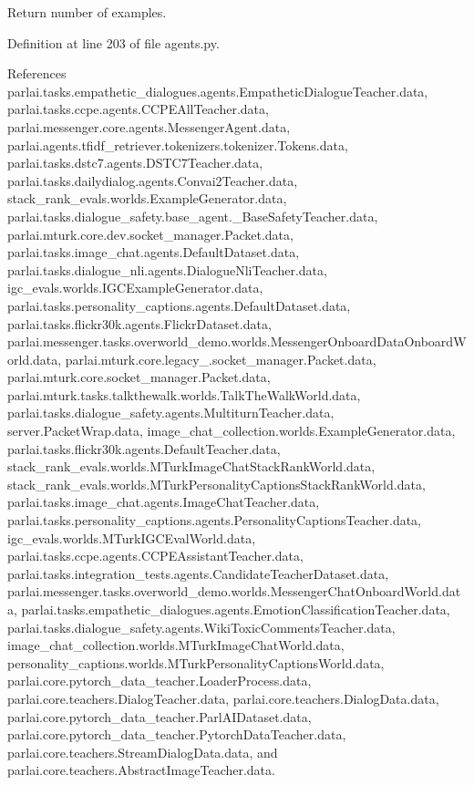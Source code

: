 \begin{DoxyVerb}Return number of examples.\end{DoxyVerb}
 

Definition at line 203 of file agents.\+py.



References parlai.\+tasks.\+empathetic\+\_\+dialogues.\+agents.\+Empathetic\+Dialogue\+Teacher.\+data, parlai.\+tasks.\+ccpe.\+agents.\+C\+C\+P\+E\+All\+Teacher.\+data, parlai.\+messenger.\+core.\+agents.\+Messenger\+Agent.\+data, parlai.\+agents.\+tfidf\+\_\+retriever.\+tokenizers.\+tokenizer.\+Tokens.\+data, parlai.\+tasks.\+dstc7.\+agents.\+D\+S\+T\+C7\+Teacher.\+data, parlai.\+tasks.\+dailydialog.\+agents.\+Convai2\+Teacher.\+data, stack\+\_\+rank\+\_\+evals.\+worlds.\+Example\+Generator.\+data, parlai.\+tasks.\+dialogue\+\_\+safety.\+base\+\_\+agent.\+\_\+\+Base\+Safety\+Teacher.\+data, parlai.\+mturk.\+core.\+dev.\+socket\+\_\+manager.\+Packet.\+data, parlai.\+tasks.\+image\+\_\+chat.\+agents.\+Default\+Dataset.\+data, parlai.\+tasks.\+dialogue\+\_\+nli.\+agents.\+Dialogue\+Nli\+Teacher.\+data, igc\+\_\+evals.\+worlds.\+I\+G\+C\+Example\+Generator.\+data, parlai.\+tasks.\+personality\+\_\+captions.\+agents.\+Default\+Dataset.\+data, parlai.\+tasks.\+flickr30k.\+agents.\+Flickr\+Dataset.\+data, parlai.\+messenger.\+tasks.\+overworld\+\_\+demo.\+worlds.\+Messenger\+Onboard\+Data\+Onboard\+World.\+data, parlai.\+mturk.\+core.\+legacy\+\_.\+socket\+\_\+manager.\+Packet.\+data, parlai.\+mturk.\+core.\+socket\+\_\+manager.\+Packet.\+data, parlai.\+mturk.\+tasks.\+talkthewalk.\+worlds.\+Talk\+The\+Walk\+World.\+data, parlai.\+tasks.\+dialogue\+\_\+safety.\+agents.\+Multiturn\+Teacher.\+data, server.\+Packet\+Wrap.\+data, image\+\_\+chat\+\_\+collection.\+worlds.\+Example\+Generator.\+data, parlai.\+tasks.\+flickr30k.\+agents.\+Default\+Teacher.\+data, stack\+\_\+rank\+\_\+evals.\+worlds.\+M\+Turk\+Image\+Chat\+Stack\+Rank\+World.\+data, stack\+\_\+rank\+\_\+evals.\+worlds.\+M\+Turk\+Personality\+Captions\+Stack\+Rank\+World.\+data, parlai.\+tasks.\+image\+\_\+chat.\+agents.\+Image\+Chat\+Teacher.\+data, parlai.\+tasks.\+personality\+\_\+captions.\+agents.\+Personality\+Captions\+Teacher.\+data, igc\+\_\+evals.\+worlds.\+M\+Turk\+I\+G\+C\+Eval\+World.\+data, parlai.\+tasks.\+ccpe.\+agents.\+C\+C\+P\+E\+Assistant\+Teacher.\+data, parlai.\+tasks.\+integration\+\_\+tests.\+agents.\+Candidate\+Teacher\+Dataset.\+data, parlai.\+messenger.\+tasks.\+overworld\+\_\+demo.\+worlds.\+Messenger\+Chat\+Onboard\+World.\+data, parlai.\+tasks.\+empathetic\+\_\+dialogues.\+agents.\+Emotion\+Classification\+Teacher.\+data, parlai.\+tasks.\+dialogue\+\_\+safety.\+agents.\+Wiki\+Toxic\+Comments\+Teacher.\+data, image\+\_\+chat\+\_\+collection.\+worlds.\+M\+Turk\+Image\+Chat\+World.\+data, personality\+\_\+captions.\+worlds.\+M\+Turk\+Personality\+Captions\+World.\+data, parlai.\+core.\+pytorch\+\_\+data\+\_\+teacher.\+Loader\+Process.\+data, parlai.\+core.\+teachers.\+Dialog\+Teacher.\+data, parlai.\+core.\+teachers.\+Dialog\+Data.\+data, parlai.\+core.\+pytorch\+\_\+data\+\_\+teacher.\+Parl\+A\+I\+Dataset.\+data, parlai.\+core.\+pytorch\+\_\+data\+\_\+teacher.\+Pytorch\+Data\+Teacher.\+data, parlai.\+core.\+teachers.\+Stream\+Dialog\+Data.\+data, and parlai.\+core.\+teachers.\+Abstract\+Image\+Teacher.\+data.

